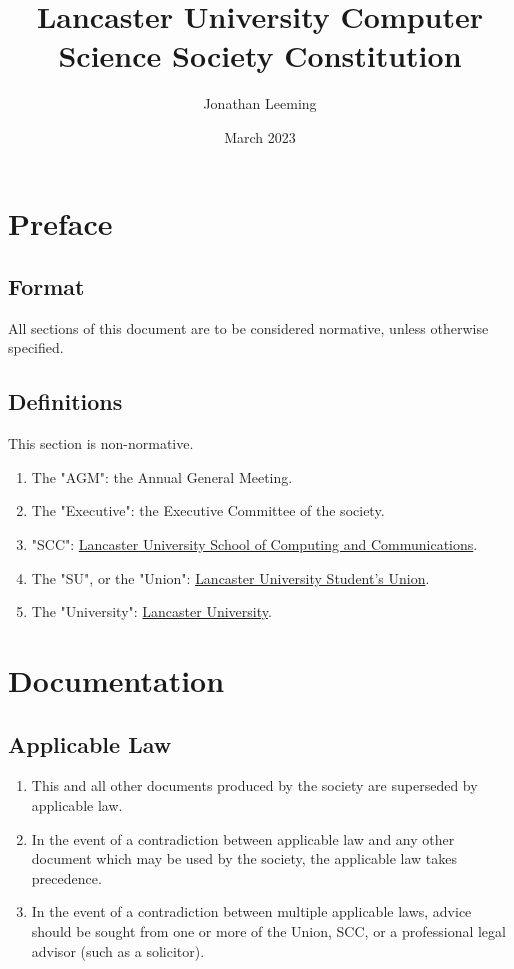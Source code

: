 \documentclass{scrartcl}
\title{Lancaster University Computer Science Society Constitution}
\author{Jonathan Leeming}
\date{March 2023}
\begin{document}
    \maketitle

    \clearpage
    \tableofcontents

    \clearpage
    \section{Preface}
        \label{preface}
        \subsection{Format}
            \label{preface--format}
            All sections of this document are to be considered normative, unless otherwise specified.

        \subsection{Definitions}
            \label{preface--definition}
            This section is non-normative.

            \begin{enumerate}
                \item The "AGM": the Annual General Meeting.
                \item The "Executive": the Executive Committee of the society.
                \item "SCC": \href{https://www.lancaster.ac.uk/scc}{Lancaster University School of Computing and Communications}.
                \item The "SU", or the "Union": \href{https://www.lancastersu.co.uk}{Lancaster University Student's Union}.
                \item The "University": \href{https://www.lancaster.ac.uk}{Lancaster University}.
            \end{enumerate}

    \clearpage
    \section{Documentation}
        \label{documentation}
        \subsection{Applicable Law}
            \label{documentation--applicable-law}
            \begin{enumerate}
                \item This and all other documents produced by the society are superseded by applicable law.
                \item In the event of a contradiction between applicable law and any other document which may be used by the society, the applicable law takes precedence.
                \item In the event of a contradiction between multiple applicable laws, advice should be sought from one or more of the Union, SCC, or a professional legal advisor (such as a solicitor).
            \end{enumerate}
\end{document}

